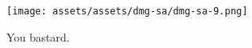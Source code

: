 \documentclass{book}
\begin{document}
\begin{figure}[hbt]
\vskip 10pt
\centering \texttt{[image: assets/assets/dmg-sa/dmg-sa-9.png]}\par\pagetwodescription You bastard.
\vskip 6pt
\end{figure}






























































\endgroup 
\end{document}
